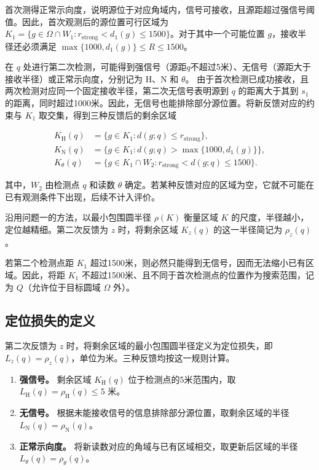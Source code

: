 \documentclass[UTF8,a4paper,zihao=-4,fontset=none]{ctexart}
\begin{document}
首次测得正常示向度，说明源位于对应角域内，信号可接收，且源距超过强信号阈值。因此，首次观测后的源位置可行区域为 \(K_1=\{g\in\Omega\cap W_1:r_{\mathrm{strong}}<d_1(g)\le1500\}\)。对于其中一个可能位置 \(g\)，接收半径还必须满足 \(\max\{1000,d_1(g)\}\le R\le1500\)。

在 \(q\) 处进行第二次检测，可能得到强信号（源距\(q\)不超过5米）、无信号（源距大于接收半径）或正常示向度，分别记为 \(\mathrm H\)、\(\mathrm N\) 和 \(\theta\)。
由于首次检测已成功接收，且两次检测对应同一个固定接收半径，第二次无信号表明源到 \(q\) 的距离大于其到 \(s_1\) 的距离，同时超过1000米。因此，无信号也能排除部分源位置。将新反馈对应的约束与 \(K_1\) 取交集，得到三种反馈后的剩余区域

\begin{equation}
\begin{aligned}
K_{\mathrm H}(q)&=\{g\in K_1:d(g;q)\le r_{\mathrm{strong}}\},\\
K_{\mathrm N}(q)&=\{g\in K_1:d(g;q)>\max\{1000,d_1(g)\}\},\\
K_\theta(q)&=\{g\in K_1\cap W_2:r_{\mathrm{strong}}<d(g;q)\le1500\}.
\end{aligned}
\label{eq:q2-pair-regions}
\end{equation}

其中，\(W_2\) 由检测点 \(q\) 和读数 \(\theta\) 确定。若某种反馈对应的区域为空，它就不可能在已有观测条件下出现，后续不计入评价。

沿用问题一的方法，以最小包围圆半径 \(\rho(K)\) 衡量区域 \(K\) 的尺度，半径越小，定位越精细。第二次反馈为 \(z\) 时，将剩余区域 \(K_z(q)\) 的这一半径简记为 \(\rho_z(q)\)。

若第二个检测点距 \(K_1\) 超过1500米，则必然只能得到无信号，因而无法缩小已有区域。因此，将距 \(K_1\) 不超过1500米、且不同于首次检测点的位置作为搜索范围，记为 \(Q\)（允许位于目标圆域 \(\Omega\) 外）。

\subsection{定位损失的定义}

第二次反馈为 \(z\) 时，将剩余区域的最小包围圆半径定义为定位损失，即 \(L_z(q)=\rho_z(q)\)，单位为米。三种反馈均按这一规则计算。

\begin{enumerate}[label=(\arabic*),leftmargin=2.2em]
  \item \textbf{强信号。} 剩余区域 \(K_{\mathrm H}(q)\) 位于检测点的5米范围内，取 \(L_{\mathrm H}(q)=\rho_{\mathrm H}(q)\le5\) 米。
  \item \textbf{无信号。} 根据未能接收信号的信息排除部分源位置，取剩余区域的半径 \(L_{\mathrm N}(q)=\rho_{\mathrm N}(q)\)。
  \item \textbf{正常示向度。} 将新读数对应的角域与已有区域相交，取更新后区域的半径 \(L_\theta(q)=\rho_\theta(q)\)。
\end{enumerate}
\end{document}
